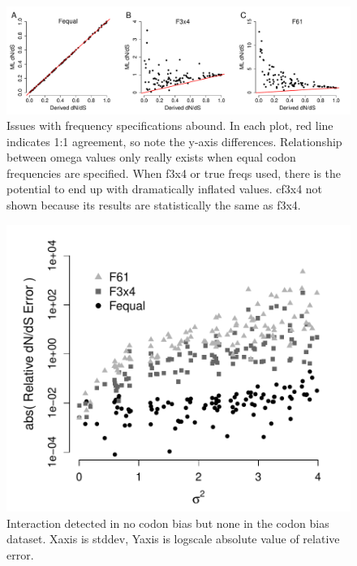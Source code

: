 \documentclass[11pt]{article}
\begin{document}
\bigskip
\begin{figure}[H]
\centerline{\includegraphics[width=8in]{figures/MainText/regression_omega_nobias.pdf}}
\caption{\label{reg_fspec} Issues with frequency specifications abound. In each plot, red line indicates 1:1 agreement, so note the y-axis differences. Relationship between omega values only really exists when equal codon frequencies are specified. When f3x4 or true freqs used, there is the potential to end up with dramatically inflated values. cf3x4 not shown because its results are statistically the same as f3x4.}
\end{figure}


\bigskip
\begin{figure}[H]
\centerline{\includegraphics[width=5in]{figures/MainText/stddev_vs_error_nobias.pdf}}
\caption{\label{stddev_error} Interaction detected in no codon bias but none in the codon bias dataset.  Xaxis is stddev, Yaxis is logscale absolute value of relative error.}
\end{figure}



\clearpage
\newpage
\end{document}
